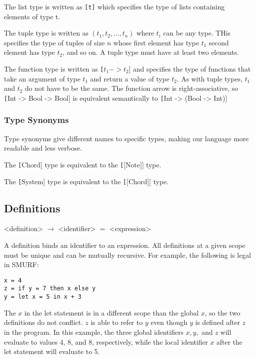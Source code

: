The list type is written as \texttt{[t]} which specifies the type of lists
containing elements of type t.

The tuple type is written as \texttt{$(t_1, t_2, \ldots, t_n)$} where $t_i$
can be any type. THis specifies the type of tuples of size $n$ whose first
element has type $t_1$ second element has type $t_2$, and so on. A tuple
type must have at least two elements.

The function type is written as \texttt[$t_1 -> t_2$] and specifies the type
of functions that take an argument of type $t_1$ and return a value of type
$t_2$. As with tuple types, $t_1$ and $t_2$ do not have to be the same.
The function arrow is right-associative, so \texttt[Int -> Bool -> Bool] is
equivalent semantically to \texttt[Int -> (Bool -> Int)]

\subsubsection{Type Synonyms}

Type synonyms give different names to specific types, making our language
more readable and less verbose.

The \texttt[Chord] type is equivalent to the \texttt[$[$Note$]$] type.

The \texttt[System] type is equivalent to the \texttt[$[$Chord$]$] type.

\subsection{Definitions}

\begin{grammar}

<definition> $\rightarrow$ <identifier> $=$ <expression>

\end{grammar}

A definition binds an identifier to an expression. All definitions at a given
scope must be unique and can be mutually recursive. For example, the following
is legal in SMURF:

\begin{verbatim}
x = 4
z = if y = 7 then x else y
y = let x = 5 in x + 3
\end{verbatim}

The $x$ in the let statement is in a different scope than the global $x$, so
the two definitions do not conflict. $z$ is able to refer to $y$ even though
$y$ is defined after $z$ in the program. In this example, the three global 
identifiers $x, y, $ and $z$ will evaluate to values 4, 8, and 8, respectively,
while the local identifier $x$ after the let statement will evaluate to 5.


